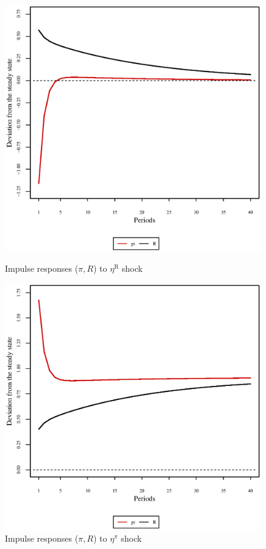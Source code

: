 \begin{figure}[h]
\begin{minipage}{0.5\textwidth}
\vspace*{-3em}
\centering
\includegraphics[width=0.99\textwidth, scale=0.55]{plots/plot_148.eps}
\caption{Impulse responses ($\pi, R$) to $\eta^{\mathrm{R}}$ shock}
\end{minipage}
\begin{minipage}{0.5\textwidth}
\vspace*{-3em}
\centering
\includegraphics[width=0.99\textwidth, scale=0.55]{plots/plot_149.eps}
\caption{Impulse responses ($\pi, R$) to $\eta^{\pi}$ shock}
\end{minipage}
\end{figure}

